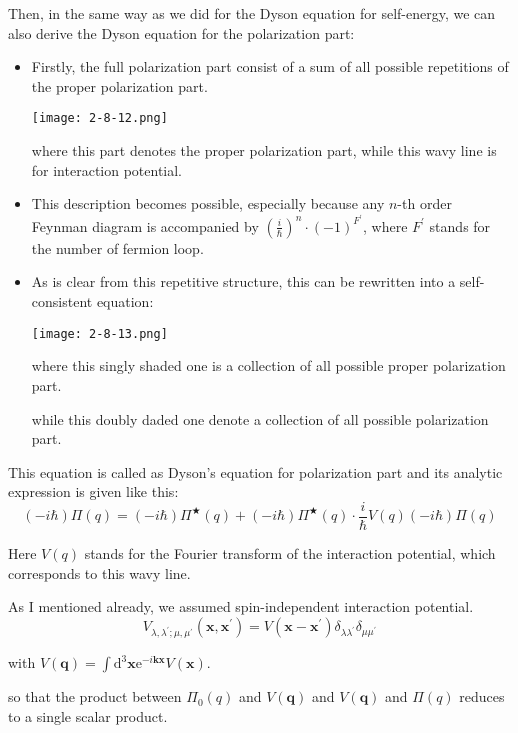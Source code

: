 Then, in the same way as we did for the Dyson equation for self-energy, we can also derive the Dyson equation for the polarization part:

\begin{itemize}
\item Firstly, the full polarization part consist of a sum of all possible repetitions of the proper polarization part.
\begin{center} \label{Fig2.8.12}
\texttt{[image: 2-8-12.png]}
\end{center}

where this part denotes the proper polarization part, while this wavy line is for interaction potential.

\item This description becomes possible, especially because any $n$-th order Feynman diagram is accompanied by $\left( \frac{i}{\hbar} \right)^n \cdot (-1)^{F^{'}}$, where $F^{'}$ stands for the number of fermion loop.

\item As is clear from this repetitive structure, this can be rewritten into a self-consistent equation:
\begin{center} \label{Fig2.8.13}
\texttt{[image: 2-8-13.png]}
\end{center}

where this singly shaded one is a collection of all possible proper polarization part.

while this doubly daded one denote a collection of all possible polarization part.
\end{itemize}

This equation is called as Dyson's equation for polarization part and its analytic expression is given like this:
\[(-i \hbar)\Pi(q) = (-i \hbar)\Pi^{\bigstar}(q)+(-i \hbar)\Pi^{\bigstar}(q) \cdot \frac{i}{\hbar} V(q) (-i\hbar)\Pi(q)\]

Here $V(q)$ stands for the Fourier transform of the interaction potential, which corresponds to this wavy line.

As I mentioned already, we assumed spin-independent interaction potential.
\[V_{\lambda,\lambda^{'};\mu,\mu^{'}}(\mathbf{x},\mathbf{x}^{'}) = V(\mathbf{x}-\mathbf{x}^{'}) \delta_{\lambda\lambda^{'}}\delta_{\mu\mu^{'}}\]

with $V(\mathbf{q})=\int \mathrm{d}^3 \mathbf{x} \mathrm{e}^{-i \mathbf{k} \mathbf{x}} V(\mathbf{x})$.

so that the product between $\Pi_0(q)$ and $V(\mathbf{q})$ and $V(\mathbf{q})$ and $\Pi(q)$ reduces to a single scalar product.

